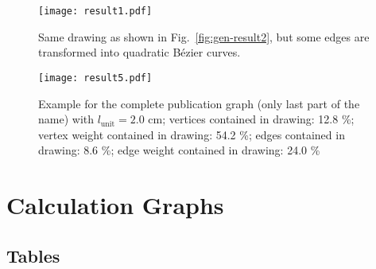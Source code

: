 \documentclass[]{llncs}
\newcommand{\lunit}{\ensuremath{l_\mathrm{unit}}\xspace}
\begin{document}
\begin{sidewaysfigure}[htbp]
	\centering
	\texttt{[image: result1.pdf]}
	\caption{Same drawing as shown in Fig.~\ref{fig:gen-result2}, but
	some edges are transformed into quadratic B\'ezier curves.}
	\label{fig:gen-result1}
\end{sidewaysfigure}

\begin{sidewaysfigure}[htbp]
	\centering
	\texttt{[image: result5.pdf]}
		\caption{Example for the complete publication graph (only last
      part of the name) with $\lunit=2.0\text{ cm}$; vertices contained
      in drawing: 12.8 \%; vertex weight contained in drawing: 54.2
      \%; edges contained in drawing: 8.6 \%; edge weight contained in
      drawing: 24.0 \%}
	\label{fig:gen-result5}
\end{sidewaysfigure}
\newpage

\section{Calculation Graphs}
\label{app:calc}

\subsection{Tables}
\label{app:calc-tables}
\end{document}
